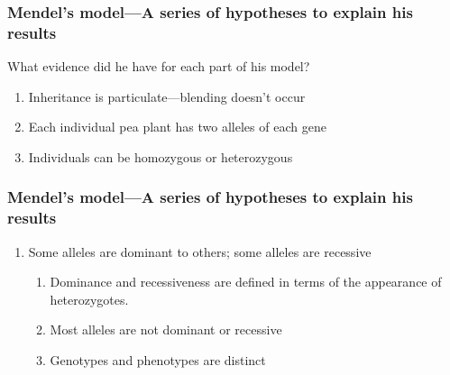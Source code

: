 \begin{frame}
    \frametitle{Mendel's model---A series of hypotheses to explain his results}
    What evidence did he have for each part of his model?

    \begin{enumerate}[<+->]
        \item Inheritance is particulate---blending doesn't occur
        \item Each individual pea plant has two alleles of each gene
        \item Individuals can be homozygous or heterozygous
    \end{enumerate}
\end{frame}

\begin{frame}
    \frametitle{Mendel's model---A series of hypotheses to explain his results}
    \begin{enumerate}[<+->]
        \addtocounter{enumi}{3}
        \item Some alleles are dominant to others; some alleles are recessive
            \begin{enumerate}
                \item Dominance and recessiveness are defined 
                    in terms of the appearance of heterozygotes.
                \item Most alleles are not dominant or recessive
                \item Genotypes and phenotypes are distinct
            \end{enumerate}
    \end{enumerate}

\end{frame}

